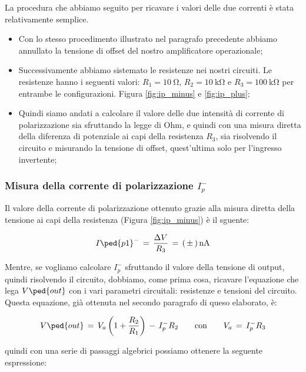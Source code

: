 La procedura che abbiamo seguito per ricavare i valori delle due correnti è stata relativamente semplice.
\begin{itemize}\itemsep2pt \parskip0pt 
	\item{Con lo stesso procedimento illustrato nel paragrafo precedente abbiamo annullato la tensione di offset del nostro amplificatore operazionale;}
	\item{Successivamente abbiamo sistemato le resistenze nei nostri circuiti. Le resistenze hanno i seguenti valori: $R_1=\SI{10}{\ohm}$, $R_2=\SI{10}{\kilo\ohm}$ e $R_3=\SI{100}{\kilo\ohm}$ per entrambe le configurazioni. Figura \ref{fig:ip_minus} e \ref{fig:ip_plus};}
	\item{Quindi siamo andati a calcolare il valore delle due intensità di corrente di polarizzazione sia sfruttando la legge di Ohm, e quindi con una misura diretta della diferenza di potenziale ai capi della resistenza $R_3$, sia risolvendo il circuito e misurando la tensione di offset, quest'ultima solo per l'ingresso invertente;}
\end{itemize}

\subsubsection*{Misura della corrente di polarizzazione $I_{p}^-$}

Il valore della corrente di polarizzazione ottenuto grazie alla misura diretta della tensione ai capi della resistenza (Figura \ref{fig:ip_minus}) è il sguente:

\begin{equation}
	I\ped{p1}^-\,=\,\frac{\Delta V}{R_3}\,=\,(\,\pm\,)\,\SI{}{\nano\ampere}
\end{equation}

Mentre, se vogliamo calcolare $I_{p}^-$ sfruttando il valore della tensione di output, quindi risolvendo il circuito, dobbiamo, come prima cosa, ricavare l'equazione che lega $V\ped{out}$ con i vari parametri circuitali: resistenze e tensioni del circuito. Questa equazione, già ottenuta nel secondo paragrafo di queso elaborato, è:

\begin{equation}
	V\ped{out}\,=\,V_a\left(1+\frac{R_2}{R_1}\right)\,-\,I_{p}^-R_2 \qquad \text{con} \qquad V_a\,=\,I_{p}^-R_3
\end{equation}

quindi con una serie di passaggi algebrici possiamo ottenere la seguente espressione:

